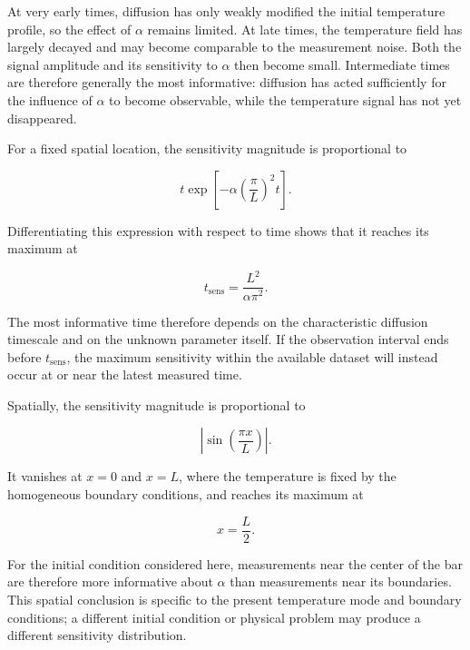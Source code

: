 At very early times, diffusion has only weakly modified the initial temperature
profile, so the effect of $\alpha$ remains limited. At late times, the temperature
field has largely decayed and may become comparable to the measurement noise.
Both the signal amplitude and its sensitivity to $\alpha$ then become small.
Intermediate times are therefore generally the most informative: diffusion has
acted sufficiently for the influence of $\alpha$ to become observable, while the
temperature signal has not yet disappeared.

For a fixed spatial location, the sensitivity magnitude is proportional to

\begin{equation}
t
\exp\left[
-\alpha
\left(\frac{\pi}{L}\right)^2t
\right].
\end{equation}

Differentiating this expression with respect to time shows that it reaches its
maximum at

\begin{equation}
t_{\mathrm{sens}}
=
\frac{L^2}{\alpha\pi^2}.
\end{equation}

The most informative time therefore depends on the characteristic diffusion
timescale and on the unknown parameter itself. If the observation interval ends
before $t_{\mathrm{sens}}$, the maximum sensitivity within the available dataset
will instead occur at or near the latest measured time.

Spatially, the sensitivity magnitude is proportional to

\begin{equation}
\left|
\sin\left(\frac{\pi x}{L}\right)
\right|.
\end{equation}

It vanishes at $x=0$ and $x=L$, where the temperature is fixed by the homogeneous
boundary conditions, and reaches its maximum at

\begin{equation}
x=\frac{L}{2}.
\end{equation}

For the initial condition considered here, measurements near the center of the
bar are therefore more informative about $\alpha$ than measurements near its
boundaries. This spatial conclusion is specific to the present temperature mode
and boundary conditions; a different initial condition or physical problem may
produce a different sensitivity distribution.

